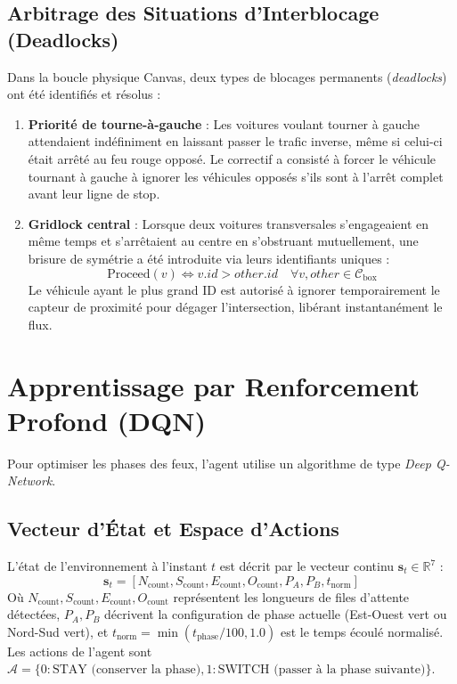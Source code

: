 \documentclass[11pt,a4paper]{article}
\begin{document}
\subsection{Arbitrage des Situations d'Interblocage (Deadlocks)}
Dans la boucle physique Canvas, deux types de blocages permanents (\textit{deadlocks}) ont été identifiés et résolus :
\begin{enumerate}
    \item \textbf{Priorité de tourne-à-gauche} : Les voitures voulant tourner à gauche attendaient indéfiniment en laissant passer le trafic inverse, même si celui-ci était arrêté au feu rouge opposé. Le correctif a consisté à forcer le véhicule tournant à gauche à ignorer les véhicules opposés s'ils sont à l'arrêt complet avant leur ligne de stop.
    \item \textbf{Gridlock central} : Lorsque deux voitures transversales s'engageaient en même temps et s'arrêtaient au centre en s'obstruant mutuellement, une brisure de symétrie a été introduite via leurs identifiants uniques :
    \begin{equation}
        \text{Proceed}(v) \iff v.id > other.id \quad \forall v, other \in \mathcal{C}_{\text{box}}
    \end{equation}
    Le véhicule ayant le plus grand ID est autorisé à ignorer temporairement le capteur de proximité pour dégager l'intersection, libérant instantanément le flux.
\end{enumerate}

\section{Apprentissage par Renforcement Profond (DQN)}
Pour optimiser les phases des feux, l'agent utilise un algorithme de type \textit{Deep Q-Network}.

\subsection{Vecteur d'État et Espace d'Actions}
L'état de l'environnement à l'instant $t$ est décrit par le vecteur continu $\mathbf{s}_t \in \mathbb{R}^7$ :
\begin{equation}
    \mathbf{s}_t = \left[ N_{\text{count}}, S_{\text{count}}, E_{\text{count}}, O_{\text{count}}, P_A, P_B, t_{\text{norm}} \right]
\end{equation}
Où $N_{\text{count}}, S_{\text{count}}, E_{\text{count}}, O_{\text{count}}$ représentent les longueurs de files d'attente détectées, $P_A, P_B$ décrivent la configuration de phase actuelle (Est-Ouest vert ou Nord-Sud vert), et $t_{\text{norm}} = \min(t_{\text{phase}}/100, 1.0)$ est le temps écoulé normalisé.
Les actions de l'agent sont $\mathcal{A} = \{0 : \text{STAY} \text{ (conserver la phase)}, 1 : \text{SWITCH} \text{ (passer à la phase suivante)}\}$.
\end{document}
